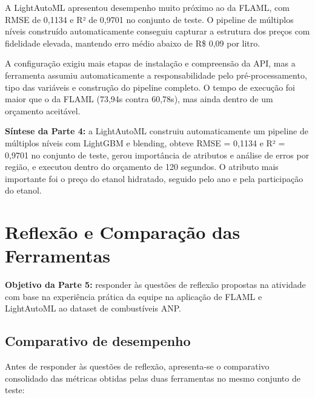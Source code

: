 \documentclass[11pt, a4paper, oneside]{article}
\begin{document}
A LightAutoML apresentou desempenho muito próximo ao da FLAML, com RMSE de 0,1134
e R² de 0,9701 no conjunto de teste. O pipeline de múltiplos níveis construído
automaticamente conseguiu capturar a estrutura dos preços com fidelidade elevada,
mantendo erro médio abaixo de R\$ 0,09 por litro.

A configuração exigiu mais etapas de instalação e compreensão da API, mas a ferramenta
assumiu automaticamente a responsabilidade pelo pré-processamento, tipo das variáveis
e construção do pipeline completo. O tempo de execução foi maior que o da FLAML
(73,94s contra 60,78s), mas ainda dentro de um orçamento aceitável.

\begin{notebox}
\textbf{Síntese da Parte 4:} a LightAutoML construiu automaticamente um pipeline
de múltiplos níveis com LightGBM e blending, obteve RMSE = 0,1134 e R² = 0,9701
no conjunto de teste, gerou importância de atributos e análise de erros por região,
e executou dentro do orçamento de 120 segundos. O atributo mais importante foi o
preço do etanol hidratado, seguido pelo ano e pela participação do etanol.
\end{notebox}

\newpage

\section{Reflexão e Comparação das Ferramentas}
\label{sec:reflexao}

\begin{infobox}
\textbf{Objetivo da Parte 5:} responder às questões de reflexão propostas na atividade
com base na experiência prática da equipe na aplicação de FLAML e LightAutoML ao
dataset de combustíveis ANP.
\end{infobox}

\subsection{Comparativo de desempenho}
\label{sec:comparativo-desempenho}

Antes de responder às questões de reflexão, apresenta-se o comparativo consolidado
das métricas obtidas pelas duas ferramentas no mesmo conjunto de teste:
\end{document}
